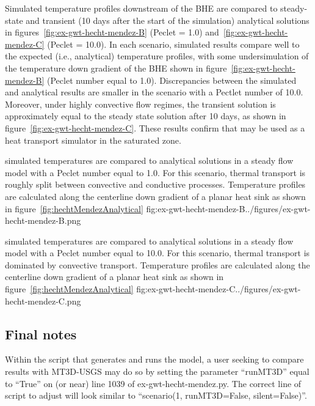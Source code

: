 Simulated temperature profiles downstream of the BHE are compared to steady-state and transient (10 days after the start of the simulation) analytical solutions in figures~\ref{fig:ex-gwt-hecht-mendez-B} (Peclet = 1.0) and~\ref{fig:ex-gwt-hecht-mendez-C} (Peclet = 10.0).  In each scenario, simulated results compare well to the expected (i.e., analytical) temperature profiles, with some undersimulation of the temperature down gradient of the BHE shown in figure~\ref{fig:ex-gwt-hecht-mendez-B} (Peclet number equal to 1.0).  Discrepancies between the simulated and analytical results are smaller in the scenario with a Pectlet number of 10.0.  Moreover, under highly convective flow regimes, the transient solution is approximately equal to the steady state solution after 10 days, as shown in figure~\ref{fig:ex-gwt-hecht-mendez-C}.  These results confirm that \mf may be used as a heat transport simulator in the saturated zone.

\begin{StandardFigure}{
                                     \mf simulated temperatures are compared to analytical solutions in a steady flow model with a Peclet number equal to 1.0. For this scenario, thermal transport is roughly split between convective and conductive processes.  Temperature profiles are calculated along the centerline down gradient of a planar heat sink as shown in figure~\ref{fig:hechtMendezAnalytical}
                                     }{fig:ex-gwt-hecht-mendez-B}{../figures/ex-gwt-hecht-mendez-B.png}
\end{StandardFigure}

\begin{StandardFigure}{
                                     \mf simulated temperatures are compared to analytical solutions in a steady flow model with a Peclet number equal to 10.0. For this scenario, thermal transport is dominated by convective transport.  Temperature profiles are calculated along the centerline down gradient of a planar heat sink as shown in figure~\ref{fig:hechtMendezAnalytical}
                                     }{fig:ex-gwt-hecht-mendez-C}{../figures/ex-gwt-hecht-mendez-C.png}
\end{StandardFigure}

\subsection{Final notes}

Within the script that generates and runs the \mf model, a user seeking to compare \mf results with MT3D-USGS may do so by setting the parameter ``runMT3D'' equal to ``True'' on (or near) line 1039 of ex-gwt-hecht-mendez.py.  The correct line of script to adjust will look similar to ``scenario(1, runMT3D=False, silent=False)''.

